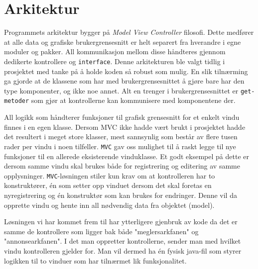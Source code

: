 \section{Arkitektur}
Programmets arkitektur bygger på \textit{Model View Controller} filosofi. Dette medfører at alle data og grafiske brukergrensesnitt er helt separert fra hverandre i egne moduler og pakker. All kommunikasjon mellom disse håndteres gjennom dedikerte kontrollere og \texttt{interface}. Denne arkitekturen ble valgt tidlig i prosjektet med tanke på å holde koden så robust som mulig. En slik tilnærming ga gjorde at de klassene som har med brukergrensesnittet å gjøre bare har den type komponenter, og ikke noe annet. Alt en trenger i brukergrensesnittet er \texttt{get-metoder} som gjør at kontrollerne kan kommunisere med komponentene der.

All logikk som håndterer funksjoner til grafisk grensesnitt for et enkelt vindu finnes i en egen klasse. Dersom MVC ikke hadde vært brukt i prosjektet hadde det resultert i meget store klasser, mest sannsynlig som består av flere tusen rader per vindu i noen tilfeller. \texttt{MVC} gav oss mulighet til å raskt legge til nye funksjoner til en allerede eksisterende vinduklasse. Et godt eksempel på dette er dersom samme vindu skal brukes både for registrering og editering av samme opplysninger. \texttt{MVC}-løsningen stiler kun krav om at kontrolleren har to konstruktører, én som setter opp vinduet dersom det skal foretas en nyregistrering og én konstruktør som kan brukes for endringer. Denne vil da opprette vindu og hente inn all nødvendig data fra objektet (model). 

Løsningen vi har kommet frem til har ytterligere gjenbruk av kode da det er samme de kontrollere som ligger bak både "meglersarkfanen" og "annonsearkfanen". I det man oppretter kontrollerne, sender man med hvilket vindu kontrolleren gjelder for. Man vil dermed ha én fysisk java-fil som styrer logikken til to vinduer som har tilnærmet lik funksjonalitet.